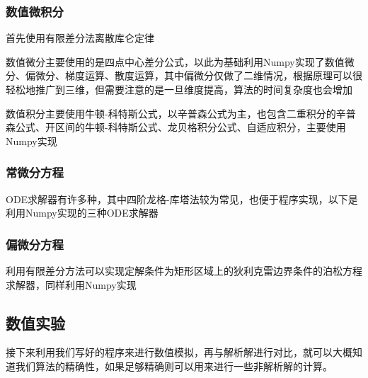 \documentclass[UTF8,a4paper,10pt]{ctexart}
\begin{document}
\begin{multicols}{2}
            \subsubsection{数值微积分}
            首先使用有限差分法离散库仑定律
            
            数值微分主要使用的是四点中心差分公式，以此为基础利用Numpy实现了数值微分、偏微分、梯度运算、散度运算，其中偏微分仅做了二维情况，根据原理可以很轻松地推广到三维，但需要注意的是一旦维度提高，算法的时间复杂度也会增加
            
            数值积分主要使用牛顿-科特斯公式，以辛普森公式为主，也包含二重积分的辛普森公式、开区间的牛顿-科特斯公式、龙贝格积分公式、自适应积分，主要使用Numpy实现
            
            \subsubsection{常微分方程}
            ODE求解器有许多种，其中四阶龙格-库塔法较为常见，也便于程序实现，以下是利用Numpy实现的三种ODE求解器
            
            \subsubsection{偏微分方程}
            利用有限差分方法可以实现定解条件为矩形区域上的狄利克雷边界条件的泊松方程求解器，同样利用Numpy实现
            
        \subsection{数值实验}
        接下来利用我们写好的程序来进行数值模拟，再与解析解进行对比，就可以大概知道我们算法的精确性，如果足够精确则可以用来进行一些非解析解的计算。

\end{multicols}
\end{document}
